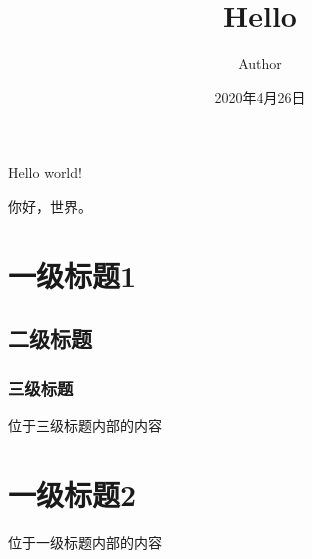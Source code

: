 \documentclass{article}
\title{Hello}
\author{Author}
\date{2020年4月26日}
\begin{document}
    \maketitle
    \tableofcontents
    Hello world!
    
    你好，世界。
    \section{一级标题1}
        \subsection{二级标题}
            \subsubsection{三级标题}
                位于三级标题内部的内容
    \section{一级标题2}
        位于一级标题内部的内容
\end{document}
